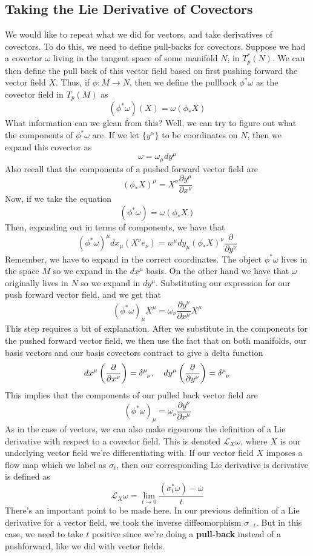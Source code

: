 \documentclass[11pt, a4paper]{article}   	%
\theoremstyle{slplain}
\begin{document}
\subsection{Taking the Lie Derivative of Covectors} 
We would like to repeat what we did for vectors, and take derivatives of covectors. 
To do this, we need to define pull-backs for covectors.
Suppose we had a covector $\omega$ living in the tangent space 
of some manifold $N$, in $T_p^*( N)$. 
We can then define the pull back of this vector field based on first pushing forward 
the vector field $X$. Thus, if $\phi : M \to  N$, then we define the pullback 
$\phi^ * \omega $ as the covector field in $T_p ( M ) $ as 
\[
( \phi^* \omega ) ( X)  = \omega ( \phi_* X ) 
\] What information can we glean from this? 
Well, we can try to figure out what the components of $\phi^ * \omega $ are. 
If we let $\{ y ^ \alpha \} $ to be coordinates on $N$, 
then we expand this covector as 
\[
\omega = \omega_\mu  dy^\mu  
\] Also recall that the components of a pushed forward vector field are 
\[
( \phi_* X )^ \mu   = X^\nu \frac{\partial y ^ \mu  }{ \partial x^\nu }
\] Now, if we take the equation 
\[
( \phi ^ * \omega )  = \omega ( \phi_* X ) 
\] Then, expanding out in terms of components, we have that 
\[
( \phi^* \omega ) ^\mu  dx_\mu  ( X^\nu  e_\nu  )  = w^\mu  dy_\mu  ( \phi_* X)^\nu  \frac{\partial }{\partial y ^\nu  }
\] Remember, we have to expand in the correct coordinates. The object $ \phi^* \omega $ lives in 
the space $M $ so we expand in the $ dx^ \mu  $ basis. On the other hand
we have that $\omega $ originally lives in $N $ so we expand in 
$ dy^ \mu  $. 
Substituting our expression for our push forward vector field, 
and we get that 
\[
( \phi^ * \omega )_\mu  X^\mu  = \omega_\nu  \frac{\partial y^\nu  }{\partial x^\mu }X^\mu  
\] This step requires a bit of explanation. 
After we substitute in the components for the pushed forward vector field, 
we then use the fact that on both manifolds, our basis vectors and 
our basis covectors contract to give a delta function 
\[
dx^\mu  \left(  \frac{\partial }{\partial x^ \nu } \right)= \delta \indices{^\mu  _\nu }, \quad dy^\mu  \left( \frac{\partial }{\partial y^\nu  }  \right) = \delta \indices{^\mu _\nu }						  
\] This implies that the components of our pulled back vector field are 
\[
( \phi^* \omega )_\mu  = \omega_\nu  \frac{\partial y^\nu }{\partial x^\mu  }
\] 
As in the case of vectors, we can also make rigourous the definition of a Lie derivative 
with respect to a covector field. 
This is denoted $\mathcal{L}_X \omega$, where $X$ is our underlying vector field
we're differentiating with. 
If our vector field $X$ imposes a flow map which we label as 
$\sigma_ t$, then our corresponding Lie derivative is derivative is defined as 
\[
\mathcal{ L }_X \omega  =\lim_{t \to 0} \frac{( \sigma_t^* \omega)   - \omega }{t }	 
\]There's an important point to be made here. 
In our previous definition of a Lie derivative for a vector field, 
we took the inverse diffeomorphism $\sigma_{ - t} $. 
But in this case, we need to take $t $ positive since 
we're doing a \textbf{pull-back} instead of a pushforward, like we did 
with vector fields. 
\end{document}
